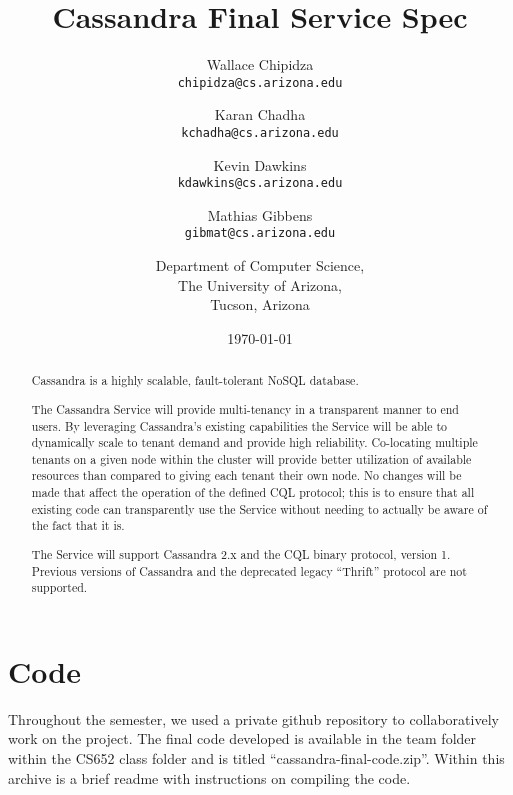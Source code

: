 \documentclass[11pt,notitlepage]{report}
\begin{document}
\setcounter{tocdepth}{4}

\title{Cassandra Final Service Spec}
\author{Wallace Chipidza \\
        \texttt{chipidza@cs.arizona.edu} 
        \and 
        Karan Chadha  \\
        \texttt{kchadha@cs.arizona.edu}
        \and 
        Kevin Dawkins \\
        \texttt{kdawkins@cs.arizona.edu} 
        \and 
        Mathias Gibbens \\
        \texttt{gibmat@cs.arizona.edu} \\ \and
Department of Computer Science, \\
The University of Arizona, \\
Tucson, Arizona}
\date{\today}
\maketitle

\null\vfill
\begin{abstract}
Cassandra is a highly scalable, fault-tolerant NoSQL database.

The Cassandra Service will provide multi-tenancy in a transparent manner to end users. By leveraging Cassandra's existing capabilities the Service will be able to dynamically scale to tenant demand and provide high reliability. Co-locating multiple tenants on a given node within the cluster will provide better utilization of available resources than compared to giving each tenant their own node. No changes will be made that affect the operation of the defined CQL protocol; this is to ensure that all existing code can transparently use the Service without needing to actually be aware of the fact that it is.

The Service will support Cassandra 2.x and the CQL binary protocol, version 1. Previous versions of Cassandra and the deprecated legacy ``Thrift'' protocol are not supported.
\end{abstract}

\newpage

\tableofcontents

\newpage

\chapter*{Code}
Throughout the semester, we used a private github repository to collaboratively work on the project. The final code developed is available in the team folder within the CS652 class folder and is titled ``cassandra-final-code.zip''. Within this archive is a brief readme with instructions on compiling the code.
\end{document}
